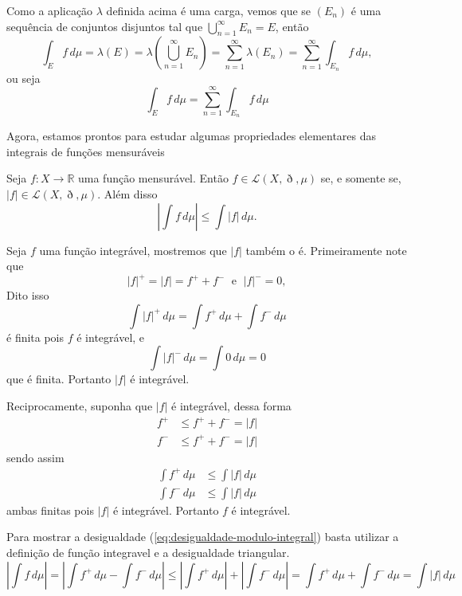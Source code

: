 \documentclass[a4paper, 11pt]{book}
\theoremstyle{definition}
\newcommand{\bR}{\mathbb{R}}
\newcommand{\cL}{\mathcal{L}}
\begin{document}
Como a aplicação $\lambda$ definida acima é uma carga, vemos que se $(E_n)$ é uma sequência de conjuntos disjuntos tal que $\bigcup_{n=1}^{\infty} E_n = E$, então
\[
    \int_E f \,d\mu = \lambda(E) = \lambda \left( \bigcup_{n=1}^{\infty} E_n \right) = \sum_{n=1}^{\infty} \lambda(E_n) = \sum_{n=1}^{\infty} \int_{E_n} f\,d\mu,
\]
ou seja
\[
    \int_E f \, d\mu = \sum_{n=1}^{\infty} \int_{E_n} f\,d\mu
\]

Agora, estamos prontos para estudar algumas propriedades elementares das integrais de funções mensuráveis

\begin{tbox} \label{thm:modulo-funcao-integravel}
    Seja $f : X \to \bR$ uma função mensurável.
    Então $f \in \cL(X,\eth,\mu)$ se, e somente se, $|f| \in \cL(X,\eth,\mu)$.
    Além disso
    \begin{equation} \label{eq:desigualdade-modulo-integral}
        \left\vert \int f \,d\mu \right\vert \leqslant \int |f| \,d\mu.
    \end{equation}
\end{tbox}
\begin{prf}
    Seja $f$ uma função integrável, mostremos que $|f|$ também o é.
    Primeiramente note que
    \[
        |f|^+ = |f| = f^+ + f^- \;\text{ e }\; |f|^- = 0,
    \]
    Dito isso
    \[
        \int |f|^+ \,d\mu = \int f^+ \,d\mu + \int f^- \,d\mu
    \]
    é finita pois $f$ é integrável, e
    \[
        \int |f|^- \,d\mu = \int 0 \,d\mu = 0
    \]
    que é finita.
    Portanto $|f|$ é integrável.

    Reciprocamente, suponha que $|f|$ é integrável, dessa forma
    \[
        \begin{aligned}
            f^+ &\leqslant f^+ + f^- = |f|\\
            f^- &\leqslant f^+ + f^- = |f|
        \end{aligned}
    \]
    sendo assim
    \[
        \begin{aligned}
            \int f^+ \,d\mu &\leqslant \int |f| \,d\mu\\
            \int f^- \,d\mu &\leqslant \int |f| \,d\mu
        \end{aligned}
    \]
    ambas finitas pois $|f|$ é integrável.
    Portanto $f$ é integrável.

    Para mostrar a desigualdade (\ref{eq:desigualdade-modulo-integral}) basta utilizar a definição de função integravel e a desigualdade triangular.
    \[
        \left\vert \int f \,d\mu \right\vert = \left\vert \int f^+ \,d\mu - \int f^- \,d\mu \right\vert \leqslant \left\vert \int f^+ \,d\mu \right\vert + \left\vert \int f^- \,d\mu \right\vert = \int f^+ \,d\mu + \int f^- \,d\mu = \int |f| \,d\mu
    \]
\end{prf}
\end{document}
